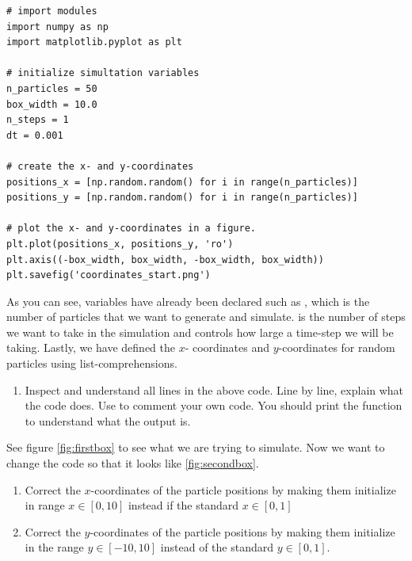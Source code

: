 \documentclass{article}
\begin{document}
\begin{lstlisting}
# import modules
import numpy as np
import matplotlib.pyplot as plt

# initialize simultation variables
n_particles = 50
box_width = 10.0
n_steps = 1
dt = 0.001

# create the x- and y-coordinates
positions_x = [np.random.random() for i in range(n_particles)]
positions_y = [np.random.random() for i in range(n_particles)]

# plot the x- and y-coordinates in a figure.
plt.plot(positions_x, positions_y, 'ro')
plt.axis((-box_width, box_width, -box_width, box_width))
plt.savefig('coordinates_start.png')
\end{lstlisting}

As you can see, variables have already been declared such as , which is the number of particles that we want to generate and simulate.
 is the number of steps we want to take in the simulation and  controls how large a time-step we will be taking.
Lastly, we have defined the $x$- coordinates and $y$-coordinates for  random particles using list-comprehensions.

\begin{enumerate}
  \item Inspect and understand all lines in the above code.
        Line by line, explain what the code does. Use \code{\#} to comment your own code.
        You should print the  function to understand what the output is.
\end{enumerate}

See figure \ref{fig:firstbox} to see what we are trying to simulate.
Now we want to change the code so that it looks like \ref{fig:secondbox}.

\begin{enumerate}
    \item Correct the $x$-coordinates of the particle positions by making them initialize in range $x \in [0, 10]$ instead if the standard $x \in [0,1]$
    \item Correct the $y$-coordinates of the particle positions by making them initialize in the range $y \in [-10,10]$ instead of the standard $y \in [0,1]$.
\end{enumerate}
\end{document}
